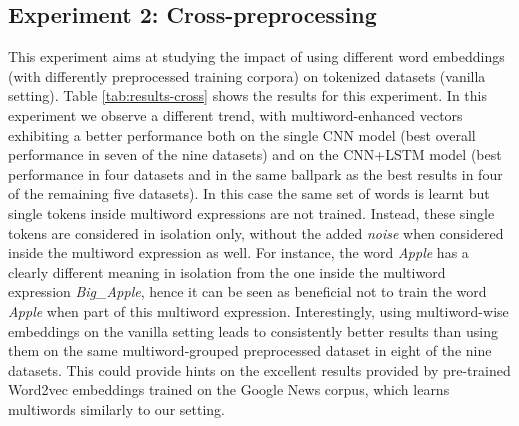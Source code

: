 \documentclass[11pt,a4paper]{article}
\begin{document}
\begin{table*}[t]
\begin{center}
{\begin{tabular}{c l c  c  c  c c c c c c}
       






       




       \bottomrule
       
    \end{tabular}
    }
    \end{center}
    \caption{Cross-preprocessing evaluation: accuracy on the topic categorization and polarity detection tasks using different sets of word embeddings to initialize the embedding layer of the two classifiers. All datasets were preprocessed similarly according to the vanilla setting.  indicates results that are statistically significant with respect to the top result. }
    \label{tab:results-cross}
\end{table*}










\subsection{Experiment 2: Cross-preprocessing}
\label{experiment2}

This experiment aims at studying the impact of using different word embeddings (with differently preprocessed training corpora) on tokenized datasets (vanilla setting). Table \ref{tab:results-cross} shows the results for this experiment. 
In this experiment we observe a different trend, with multiword-enhanced vectors exhibiting a better performance both on the single CNN model (best overall performance in seven of the nine datasets) and on the CNN+LSTM model (best performance in four datasets and in the same ballpark as the best results in four of the remaining five datasets).
In this case the same set of words is learnt but single tokens inside multiword expressions are not trained. Instead, these single tokens are considered in isolation only, without the added \textit{noise} when considered inside the multiword expression as well. For instance, the word \textit{Apple} has a clearly different meaning in isolation from the one inside the multiword expression \textit{Big\_Apple}, hence it can be seen as beneficial not to train the word \textit{Apple} when part of this multiword expression. Interestingly, using multiword-wise embeddings on the vanilla setting leads to consistently better results than using them on the same multiword-grouped preprocessed dataset in eight of the nine datasets. This could provide hints on the excellent results provided by pre-trained Word2vec embeddings trained on the Google News corpus, which learns multiwords similarly to our setting.
\end{document}
